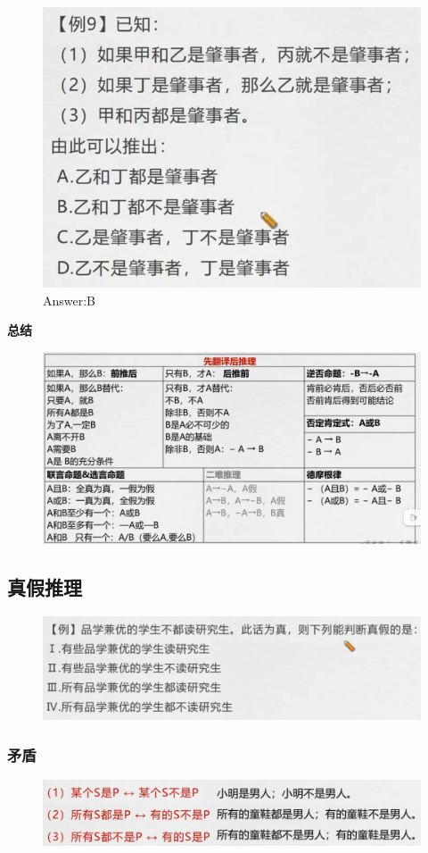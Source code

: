 \documentclass{article}
\numberwithin{equation}{section}						%
\numberwithin{figure}{section}							%
\begin{document}
\begin{sloppypar}
\begin{figure}[H]
     \centering
     \includegraphics[width=0.45\linewidth]{162.png}
	\caption{Answer:B}
\end{figure}


\textbf{总结}

\begin{figure}[H]
     \centering
     \includegraphics[width=0.65\linewidth]{163.png}
\end{figure}





\subsection{真假推理}

\begin{figure}[H]
     \centering
     \includegraphics[width=0.6\linewidth]{164.png}
\end{figure}


\subsubsection{矛盾}


\begin{figure}[H]
     \centering
     \includegraphics[width=0.6\linewidth]{165.png}
\end{figure}



\end{sloppypar}
\end{document}
